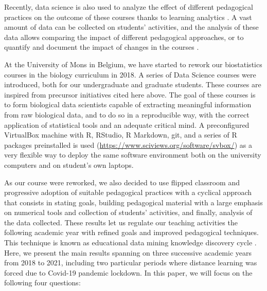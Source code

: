 \documentclass{aims}
\theoremstyle{definition}
\begin{document}
Recently, data science is also used to analyze the effect of different
pedagogical practices on the outcome of these courses thanks to learning
analytics \cite{Estrellado2020}. A vast amount of data can be collected
on students' activities, and the analysis of these data allows comparing
the impact of different pedagogical approaches, or to quantify and
document the impact of changes in the courses \cite{Romero2020}.

At the University of Mons in Belgium, we have started to rework our
biostatistics courses in the biology curriculum in 2018. A series of
Data Science courses were introduced, both for our undergraduate and
graduate students. These courses are inspired from precursor initiatives
cited here above. The goal of these courses is to form biological data
scientists capable of extracting meaningful information from raw
biological data, and to do so in a reproducible way, with the correct
application of statistical tools and an adequate critical mind. A
preconfigured VirtualBox machine with R, RStudio, R Markdown, git, and a
series of R packages preinstalled is used
(\url{https://www.sciviews.org/software/svbox/}) as a very flexible way
to deploy the same software environment both on the university computers
and on student's own laptops.

As our course were reworked, we also decided to use flipped classroom
and progressive adoption of suitable pedagogical practices with a
cyclical approach that consists in stating goals, building pedagogical
material with a large emphasis on numerical tools and collection of
students' activities, and finally, analysis of the data collected. These
results let us regulate our teaching activities the following academic
year with refined goals and improved pedagogical techniques. This
technique is known as educational data mining knowledge discovery cycle
\cite{Romero2020}. Here, we present the main results spanning on three
successive academic years from 2018 to 2021, including two particular
periods where distance learning was forced due to Covid-19 pandemic
lockdown. In this paper, we will focus on the following four questions:
\end{document}
